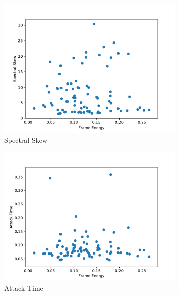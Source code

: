\begin{figure}[H]
    \center
    \includegraphics[width = 0.8\textwidth]{Figures/specSkew.pdf}
    \caption{Spectral Skew}
    \label{fig:im}
\end{figure}

\begin{figure}[H]
    \center
    \includegraphics[width = 0.8\textwidth]{Figures/att.pdf}
    \caption{Attack Time}
    \label{fig:im}
\end{figure}


